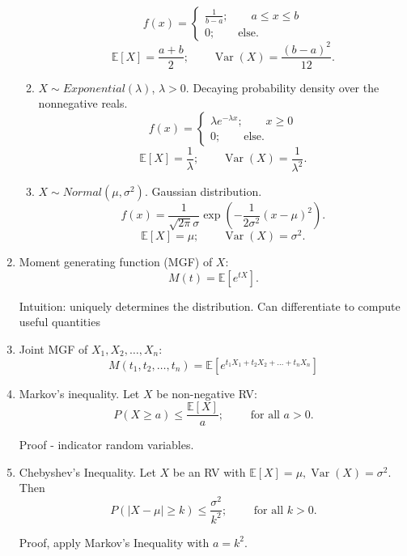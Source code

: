 \documentclass{article}
\newcommand{\EE}{\mathbb{E}}
\DeclareMathOperator{\Var}{Var}
\begin{document}
\begin{enumerate}
\begin{enumerate}
        \[
          f(x) =
          \begin{cases}
            \frac{1}{b-a}; \qquad a \leq x \leq b \\
            0; \qquad \text{else}.
          \end{cases}
        \]
        \[
          \EE[X] = \frac{a+b}{2}; \qquad \Var(X) = \frac{(b-a)^2}{12}.
        \]
      \item $X \sim Exponential(\lambda)$, $\lambda >0$.  Decaying probability density over the nonnegative reals.
        \[
          f(x) =
          \begin{cases}
            \lambda e^{-\lambda x}; \qquad x \geq 0 \\
            0; \qquad \text{else}.
          \end{cases}
        \]
        \[
          \EE[X] = \frac{1}{\lambda}; \qquad \Var(X) = \frac{1}{\lambda^2}.
        \]

      \item $X \sim Normal(\mu, \sigma^2)$.  Gaussian distribution.
        \[
          f(x) = \frac{1}{\sqrt{2\pi} \sigma} \exp\left(  - \frac{1}{2\sigma^2} (x-\mu)^2 \right).
        \]
        \[
          \EE[X] = \mu; \qquad \Var(X) = \sigma^2.
        \]
    \end{enumerate}

  \item Moment generating function (MGF) of $X$:
    \[
      M(t) = \EE[e^{tX}].
    \]

    Intuition: uniquely determines the distribution.  Can differentiate to compute useful quantities

  \item Joint MGF of $X_1, X_2, \dots, X_n$:
    \[
      M(t_1, t_2, \dots, t_n) = \EE[e^{t_1X_1 + t_2X_2 + \dots + t_n X_n}]
    \]


  \item Markov's inequality.  Let $X$ be non-negative RV:
    \[
      P(X \geq a) \leq \frac{\EE[X]}{a}; \qquad \text{ for all } a > 0.
    \]

    Proof - indicator random variables.

  \item Chebyshev's Inequality.  Let $X$ be an RV with $\EE[X] = \mu, \Var(X) = \sigma^2$.  Then
    \[
      P(|X - \mu| \geq  k) \leq \frac{\sigma^2}{k^2}; \qquad \text{ for all } k > 0.
    \]

    Proof, apply Markov's Inequality with $a = k^2$.


\end{enumerate}
\end{document}
